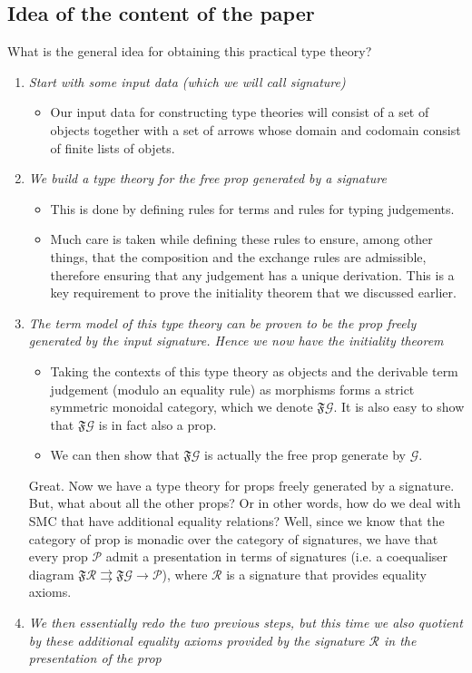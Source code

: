 \documentclass[pra,floatfix,
amsmath,superscriptaddress, 12pt]{article}
\theoremstyle{definition}
\newcommand{\fF}{\mathfrak{F}}
\newcommand{\cG}{\mathcal{G}}
\newcommand{\cR}{\mathcal{R}}
\begin{document}
\subsection{Idea of the content of the paper}


What is the general idea for obtaining this practical type theory?\\
\begin{enumerate}
	\item \textit{Start with some input data (which we will call signature)}
		\begin{itemize}
			\item Our input data for constructing type theories will consist of a set of objects together with a set of arrows whose domain and codomain consist of finite lists of objets.
		\end{itemize}
	\item \textit{We build a type theory for the free prop generated by a signature}
		\begin{itemize}
			\item This is done by defining rules for terms and rules for typing judgements.
			\item Much care is taken while defining these rules to ensure, among other things, that the composition and the exchange rules are admissible, therefore ensuring that any judgement has a unique derivation. This is a key requirement to prove the initiality theorem that we discussed earlier.		
		\end{itemize}
	\item \textit{The term model of this type theory can be proven to be the prop freely generated by the input signature. Hence we now have the initiality theorem}
		\begin{itemize}
			\item Taking the contexts of this type theory as objects and the derivable term judgement (modulo an equality rule) as morphisms forms a strict symmetric monoidal category, which we denote $\fF\cG$. It is also easy to show that $\fF\cG$ is in fact also a prop.
			\item We can then show that $\fF\cG$ is actually the free prop generate by $\cG$.
		\end{itemize}
	Great. Now we have a type theory for props freely generated by a signature. But, what about all the other props? Or in other words, how do we deal with SMC that have additional equality relations? Well, since we know that the category of prop is monadic over the category of signatures, we have that every prop $\mathcal{P}$ admit a presentation in terms of signatures (i.e. a coequaliser diagram $\fF\cR \rightrightarrows \fF\cG\rightarrow\mathcal{P}$), where $\cR$ is a signature that provides equality axioms.
	\item \textit{We then essentially redo the two previous steps, but this time we also quotient by these additional equality axioms provided by the signature $\cR$ in the presentation of the prop}
\end{enumerate}
\end{document}
